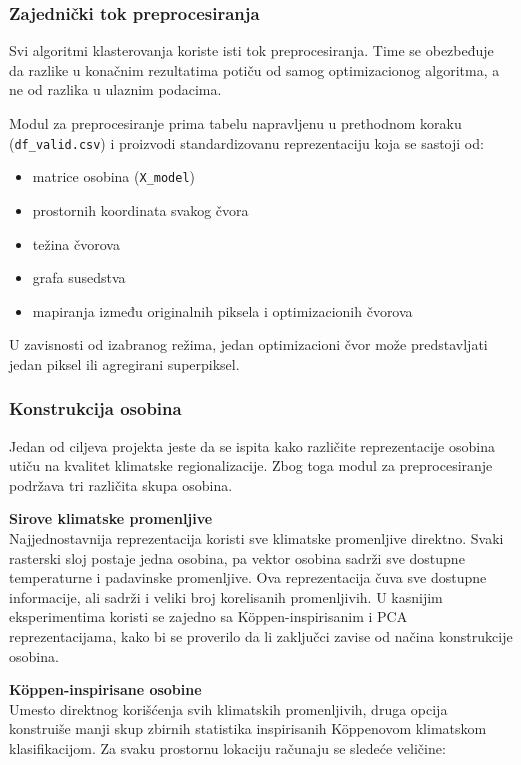 \documentclass[11pt]{article}
\begin{document}
\subsubsection{Zajednički tok preprocesiranja}

Svi algoritmi klasterovanja koriste isti tok preprocesiranja. Time se obezbeđuje da razlike u konačnim rezultatima potiču od samog optimizacionog algoritma, a ne od razlika u ulaznim podacima.

Modul za preprocesiranje prima tabelu napravljenu u prethodnom koraku (\texttt{df\_valid.csv}) i proizvodi standardizovanu reprezentaciju koja se sastoji od:
\begin{itemize}
  \item matrice osobina (\texttt{X\_model})
  \item prostornih koordinata svakog čvora
  \item težina čvorova
  \item grafa susedstva
  \item mapiranja između originalnih piksela i optimizacionih čvorova
\end{itemize}

U zavisnosti od izabranog režima, jedan optimizacioni čvor može predstavljati jedan piksel ili agregirani superpiksel.

\subsubsection{Konstrukcija osobina}
Jedan od ciljeva projekta jeste da se ispita kako različite reprezentacije osobina utiču na kvalitet klimatske regionalizacije. Zbog toga modul za preprocesiranje podržava tri različita skupa osobina.

\textbf{Sirove klimatske promenljive} \\
Najjednostavnija reprezentacija koristi sve klimatske promenljive direktno. Svaki rasterski sloj postaje jedna osobina, pa vektor osobina sadrži sve dostupne temperaturne i padavinske promenljive. Ova reprezentacija čuva sve dostupne informacije, ali sadrži i veliki broj korelisanih promenljivih. U kasnijim eksperimentima koristi se zajedno sa Köppen-inspirisanim i PCA reprezentacijama, kako bi se proverilo da li zaključci zavise od načina konstrukcije osobina.

\textbf{Köppen-inspirisane osobine} \\
Umesto direktnog korišćenja svih klimatskih promenljivih, druga opcija konstruiše manji skup zbirnih statistika inspirisanih Köppenovom klimatskom klasifikacijom. Za svaku prostornu lokaciju računaju se sledeće veličine:
\end{document}
